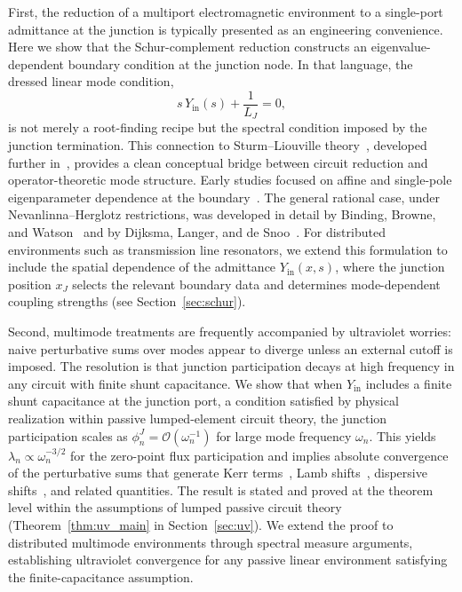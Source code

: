 \documentclass[reprint, floatfix, superscriptaddress, amsmath, amssymb, longbibliography]{revtex4-2}
\newcommand{\Yin}{Y_{\mathrm{in}}}
\begin{document}
First, the reduction of a multiport electromagnetic environment to a single-port admittance at the junction is typically presented as an engineering convenience. Here we show that the Schur-complement reduction constructs an eigenvalue-dependent boundary condition at the junction node. In that language, the dressed linear mode condition,
\begin{equation}
s\,\Yin(s)+\frac{1}{L_J}=0,
\end{equation}
is not merely a root-finding recipe but the spectral condition imposed by the junction termination. This connection to Sturm--Liouville theory~\cite{Fulton1977, Walter1973, Zettl2005}, developed further in~\cite{BakrQM2025}, provides a clean conceptual bridge between circuit reduction and operator-theoretic mode structure. Early studies focused on affine and single-pole eigenparameter dependence at the boundary~\cite{Fulton1977, Walter1973}. The general rational case, under Nevanlinna–Herglotz restrictions, was developed in detail by Binding, Browne, and Watson~\cite{Binding2002I, Binding2002II} and by Dijksma, Langer, and de Snoo~\cite{Dijksma1987}. For distributed environments such as transmission line resonators, we extend this formulation to include the spatial dependence of the admittance $\Yin(x,s)$, where the junction position $x_J$ selects the relevant boundary data and determines mode-dependent coupling strengths (see Section~\ref{sec:schur}).

Second, multimode treatments are frequently accompanied by ultraviolet worries: naive perturbative sums over modes appear to diverge unless an external cutoff is imposed. The resolution is that junction participation decays at high frequency in any circuit with finite shunt capacitance. We show that when $\Yin$ includes a finite shunt capacitance at the junction port, a condition satisfied by physical realization within passive lumped-element circuit theory, the junction participation scales as $\phi_n^J=\mathcal{O}(\omega_n^{-1})$ for large mode frequency $\omega_n$. This yields $\lambda_n\propto \omega_n^{-3/2}$ for the zero-point flux participation and implies absolute convergence of the perturbative sums that generate Kerr terms~\cite{Nigg2012}, Lamb shifts~\cite{Lamb1947, Bethe1947}, dispersive shifts~\cite{Schuster2005}, and related quantities. The result is stated and proved at the theorem level within the assumptions of lumped passive circuit theory~\cite{Newcomb1966, Anderson1973} (Theorem~\ref{thm:uv_main} in Section~\ref{sec:uv}). We extend the proof to distributed multimode environments through spectral measure arguments, establishing ultraviolet convergence for any passive linear environment satisfying the finite-capacitance assumption.
\end{document}
